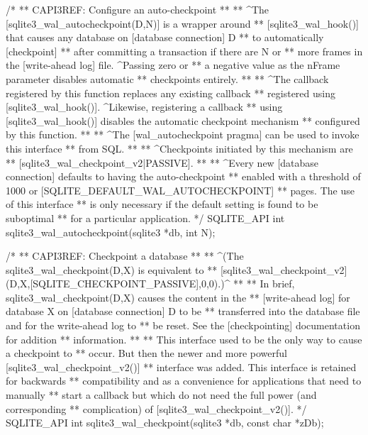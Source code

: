 \begin{Codex}[label=sqlite3.h,numbers=left]
{/*
** CAPI3REF: Configure an auto-checkpoint
**
** ^The [sqlite3_wal_autocheckpoint(D,N)] is a wrapper around
** [sqlite3_wal_hook()] that causes any database on [database connection] D
** to automatically [checkpoint]
** after committing a transaction if there are N or
** more frames in the [write-ahead log] file.  ^Passing zero or 
** a negative value as the nFrame parameter disables automatic
** checkpoints entirely.
**
** ^The callback registered by this function replaces any existing callback
** registered using [sqlite3_wal_hook()].  ^Likewise, registering a callback
** using [sqlite3_wal_hook()] disables the automatic checkpoint mechanism
** configured by this function.
**
** ^The [wal_autocheckpoint pragma] can be used to invoke this interface
** from SQL.
**
** ^Checkpoints initiated by this mechanism are
** [sqlite3_wal_checkpoint_v2|PASSIVE].
**
** ^Every new [database connection] defaults to having the auto-checkpoint
** enabled with a threshold of 1000 or [SQLITE_DEFAULT_WAL_AUTOCHECKPOINT]
** pages.  The use of this interface
** is only necessary if the default setting is found to be suboptimal
** for a particular application.
*/
SQLITE_API int sqlite3_wal_autocheckpoint(sqlite3 *db, int N);

/*
** CAPI3REF: Checkpoint a database
**
** ^(The sqlite3_wal_checkpoint(D,X) is equivalent to
** [sqlite3_wal_checkpoint_v2](D,X,[SQLITE_CHECKPOINT_PASSIVE],0,0).)^
**
** In brief, sqlite3_wal_checkpoint(D,X) causes the content in the 
** [write-ahead log] for database X on [database connection] D to be
** transferred into the database file and for the write-ahead log to
** be reset.  See the [checkpointing] documentation for addition
** information.
**
** This interface used to be the only way to cause a checkpoint to
** occur.  But then the newer and more powerful [sqlite3_wal_checkpoint_v2()]
** interface was added.  This interface is retained for backwards
** compatibility and as a convenience for applications that need to manually
** start a callback but which do not need the full power (and corresponding
** complication) of [sqlite3_wal_checkpoint_v2()].
*/
SQLITE_API int sqlite3_wal_checkpoint(sqlite3 *db, const char *zDb);

}
\end{Codex}
